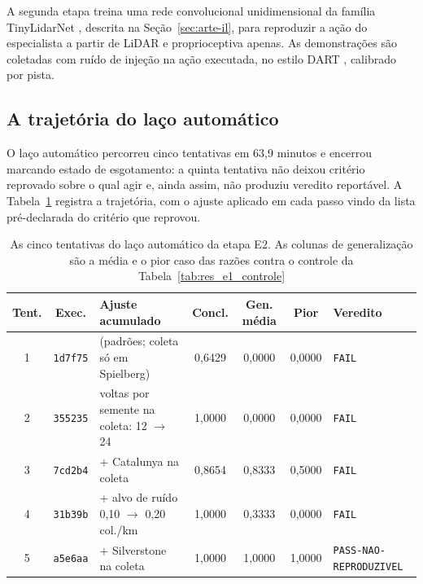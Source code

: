 A segunda etapa treina uma rede convolucional unidimensional da família
TinyLidarNet \cite{Zarrar2024TinyLidarNet}, descrita na
Seção~\ref{sec:arte-il}, para reproduzir a ação do especialista a partir de
LiDAR e proprioceptiva apenas. As demonstrações são coletadas com ruído de
injeção na ação executada, no estilo DART \cite{Laskey2017DART}, calibrado por
pista.

\subsection{A trajetória do laço automático}

O laço automático percorreu cinco tentativas em 63,9 minutos e encerrou marcando
estado de esgotamento: a quinta tentativa não deixou critério reprovado sobre o
qual agir e, ainda assim, não produziu veredito reportável. A
Tabela~\ref{tab:res_e2_laco} registra a trajetória, com o ajuste aplicado em cada
passo vindo da lista pré-declarada do critério que reprovou.

\begin{table}[h]
    \centering
    \footnotesize
    \setlength{\tabcolsep}{3pt}
    \begin{tabularx}{\textwidth}{|c|c|>{\raggedright\arraybackslash}X|c|c|c|>{\raggedright\arraybackslash}X|}
        \hline
        \textbf{Tent.} & \textbf{Exec.} & \textbf{Ajuste acumulado} &
        \textbf{Concl.} & \textbf{Gen. média} & \textbf{Pior} &
        \textbf{Veredito} \\
        \hline
        1 & \texttt{1d7f75} & (padrões; coleta só em Spielberg) & 0,6429 &
        0,0000 & 0,0000 & \texttt{FAIL} \\
        \hline
        2 & \texttt{355235} & voltas por semente na coleta: 12 $\to$ 24 &
        1,0000 & 0,0000 & 0,0000 & \texttt{FAIL} \\
        \hline
        3 & \texttt{7cd2b4} & + Catalunya na coleta & 0,8654 & 0,8333 & 0,5000 &
        \texttt{FAIL} \\
        \hline
        4 & \texttt{31b39b} & + alvo de ruído 0,10 $\to$ 0,20 col./km & 1,0000 &
        0,3333 & 0,0000 & \texttt{FAIL} \\
        \hline
        5 & \texttt{a5e6aa} & + Silverstone na coleta & 1,0000 & 1,0000 &
        1,0000 & \texttt{PASS-NAO-REPRODUZIVEL} \\
        \hline
    \end{tabularx}
    \caption{As cinco tentativas do laço automático da etapa E2. As colunas de
    generalização são a média e o pior caso das razões contra o controle da
    Tabela~\ref{tab:res_e1_controle}}
    \label{tab:res_e2_laco}
\end{table}

